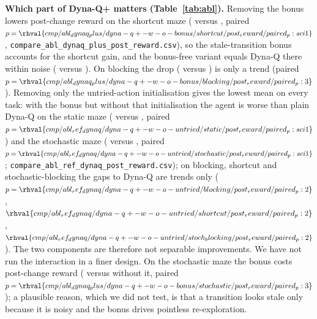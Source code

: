 \begin{table}[t]\centering\caption{Dyna-Q+ ablation, post-change reward, $n=10$, 20 seeds, mean (standard deviation). ``w/o both'' is Dyna-Q.}\label{tab:abl}
\resizebox{\columnwidth}{!}{}
\end{table}

\begin{table}[t]\centering\caption{Sensitivity of Dyna-Q+ ($n=10$, 10 seeds, mean) to the bonus weight $\kappa$; the last column is Dyna-Q on the same seeds.}\label{tab:kappa}
\resizebox{\columnwidth}{!}{}
\end{table}

\textbf{Which part of Dyna-Q+ matters (Table~\ref{tab:abl}).} Removing the bonus lowers post-change reward on the shortcut maze ( versus , paired $p=\rhval{cmp/abl_dynaq_plus/dyna-q+-w-o-bonus/shortcut/post_reward/paired_p:sci1}$, \texttt{compare\_abl\_dynaq\_plus\_post\_reward.csv}), so the stale-transition bonus accounts for the shortcut gain, and the bonus-free variant equals Dyna-Q there within noise ( versus ). On blocking the drop ( versus ) is only a trend (paired $p=\rhval{cmp/abl_dynaq_plus/dyna-q+-w-o-bonus/blocking/post_reward/paired_p:3}$). Removing only the untried-action initialisation gives the lowest mean on every task: with the bonus but without that initialisation the agent is worse than plain Dyna-Q on the static maze ( versus , paired $p=\rhval{cmp/abl_ref_dynaq/dyna-q+-w-o-untried/static/post_reward/paired_p:sci1}$) and the stochastic maze ( versus , paired $p=\rhval{cmp/abl_ref_dynaq/dyna-q+-w-o-untried/stochastic/post_reward/paired_p:sci1}$; \texttt{compare\_abl\_ref\_dynaq\_post\_reward.csv}); on blocking, shortcut and stochastic-blocking the gaps to Dyna-Q are trends only ($p=\rhval{cmp/abl_ref_dynaq/dyna-q+-w-o-untried/blocking/post_reward/paired_p:2}$, $\rhval{cmp/abl_ref_dynaq/dyna-q+-w-o-untried/shortcut/post_reward/paired_p:2}$, $\rhval{cmp/abl_ref_dynaq/dyna-q+-w-o-untried/stoch_blocking/post_reward/paired_p:2}$). The two components are therefore not separable improvements. We have not run the interaction in a finer design. On the stochastic maze the bonus costs post-change reward ( versus  without it, paired $p=\rhval{cmp/abl_dynaq_plus/dyna-q+-w-o-bonus/stochastic/post_reward/paired_p:3}$); a plausible reason, which we did not test, is that a transition looks stale only because it is noisy and the bonus drives pointless re-exploration.

